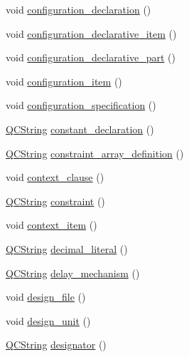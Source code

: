\begin{DoxyCompactItemize}
\item 
void \hyperlink{classvhdl_1_1parser_1_1_vhdl_parser_ae2591a002b7b65d3fbcc39d85d187d24}{configuration\+\_\+declaration} ()
\item 
void \hyperlink{classvhdl_1_1parser_1_1_vhdl_parser_a82f9eecc8fba1286d4de270341f3eed5}{configuration\+\_\+declarative\+\_\+item} ()
\item 
void \hyperlink{classvhdl_1_1parser_1_1_vhdl_parser_ad2e9a22e9948bbe69fb0ed902a575d56}{configuration\+\_\+declarative\+\_\+part} ()
\item 
void \hyperlink{classvhdl_1_1parser_1_1_vhdl_parser_a107ba4e6289657266813e917f1348a1d}{configuration\+\_\+item} ()
\item 
void \hyperlink{classvhdl_1_1parser_1_1_vhdl_parser_ae2c45ff2502349c5f8a762021857fc37}{configuration\+\_\+specification} ()
\item 
\hyperlink{class_q_c_string}{Q\+C\+String} \hyperlink{classvhdl_1_1parser_1_1_vhdl_parser_a6b55f972c047e6188d572e89749fc83e}{constant\+\_\+declaration} ()
\item 
\hyperlink{class_q_c_string}{Q\+C\+String} \hyperlink{classvhdl_1_1parser_1_1_vhdl_parser_a612ea897c65aecc40984a4d1e518a737}{constraint\+\_\+array\+\_\+definition} ()
\item 
void \hyperlink{classvhdl_1_1parser_1_1_vhdl_parser_a9072540d7fbf2a62b44cdd6daa185979}{context\+\_\+clause} ()
\item 
\hyperlink{class_q_c_string}{Q\+C\+String} \hyperlink{classvhdl_1_1parser_1_1_vhdl_parser_a6bbed72fb3d492938d632dd638a3bf9e}{constraint} ()
\item 
void \hyperlink{classvhdl_1_1parser_1_1_vhdl_parser_a33f8cf1154af04ea16d1ef5fbeee4526}{context\+\_\+item} ()
\item 
\hyperlink{class_q_c_string}{Q\+C\+String} \hyperlink{classvhdl_1_1parser_1_1_vhdl_parser_a2027829780b26233d04dd95e06a4da9c}{decimal\+\_\+literal} ()
\item 
\hyperlink{class_q_c_string}{Q\+C\+String} \hyperlink{classvhdl_1_1parser_1_1_vhdl_parser_a9f421597b6ac4a2e33ca65b56cdeaa11}{delay\+\_\+mechanism} ()
\item 
void \hyperlink{classvhdl_1_1parser_1_1_vhdl_parser_abe6271fb182b04e090fa635c94572db4}{design\+\_\+file} ()
\item 
void \hyperlink{classvhdl_1_1parser_1_1_vhdl_parser_a27eb53da75f0ce010a2c6e1793ee2cc4}{design\+\_\+unit} ()
\item 
\hyperlink{class_q_c_string}{Q\+C\+String} \hyperlink{classvhdl_1_1parser_1_1_vhdl_parser_a6c60294853fb6f2bf574722ae7bcb8f8}{designator} ()

\end{DoxyCompactItemize}
